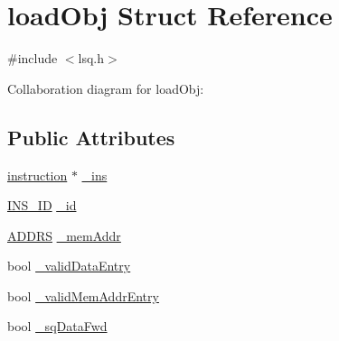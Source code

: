 \hypertarget{structloadObj}{
\section{loadObj Struct Reference}
\label{structloadObj}
}


{\ttfamily \#include $<$lsq.h$>$}



Collaboration diagram for loadObj:
\subsection*{Public Attributes}
\begin{DoxyCompactItemize}
\item 
\hyperlink{classinstruction}{instruction} $\ast$ \hyperlink{structloadObj_ae32e4dcdfc8c2579dd13f4eaec948f4e}{\_\-ins}
\item 
\hyperlink{global_2global_8h_a1883c47d0023d0f200e1d86eced6a070}{INS\_\-ID} \hyperlink{structloadObj_a97df4b71c67011b6ee95425d2064f611}{\_\-id}
\item 
\hyperlink{global_2global_8h_a7ea74bb9ffd2e4d41550ae2383dd25bc}{ADDRS} \hyperlink{structloadObj_a3e67fd0b457d87133712c8e394751a0e}{\_\-memAddr}
\item 
bool \hyperlink{structloadObj_acd2c9ebea408592d102df591d4f9b595}{\_\-validDataEntry}
\item 
bool \hyperlink{structloadObj_aaf2d7a6675caaceff6e594f0686ccb82}{\_\-validMemAddrEntry}
\item 
bool \hyperlink{structloadObj_a013f319b3bb0148e9bd00d6742d54246}{\_\-sqDataFwd}
\end{DoxyCompactItemize}


